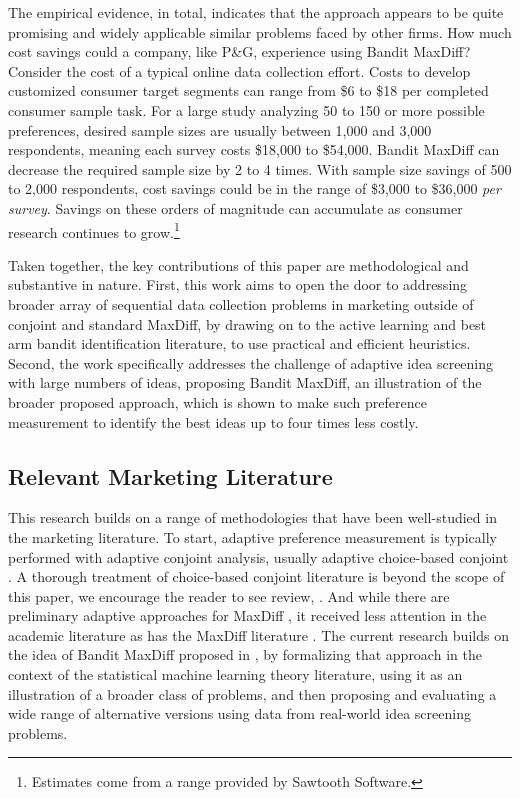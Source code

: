 \documentclass[blindrev,mnsc]{informs3}
\begin{document}
The empirical evidence, in total, indicates that the approach appears to be quite promising and widely applicable similar problems faced by other firms. How much cost savings could a company, like P\&G, experience using Bandit MaxDiff? Consider the cost of a typical online data collection effort. Costs to develop customized consumer target segments can range from \$6 to \$18 per completed consumer sample task. For a large study analyzing 50 to 150 or more possible preferences, desired sample sizes are usually between 1,000 and 3,000 respondents, meaning each survey costs \$18,000 to \$54,000. Bandit MaxDiff can decrease the required sample size by 2 to 4 times. With sample size savings of 500 to 2,000 respondents, cost savings could be in the range of \$3,000 to \$36,000 \emph{per survey}. Savings on these orders of magnitude can accumulate as consumer research continues to grow.\footnote{Estimates come from a range provided by Sawtooth Software.}

Taken together, the key contributions of this paper are methodological and substantive in nature. First, this work aims to open the door to addressing broader array of sequential data collection problems in marketing outside of conjoint and standard MaxDiff, by drawing on to the active learning and best arm bandit identification literature, to use practical and efficient heuristics. Second, the work specifically addresses the challenge of adaptive idea screening with large numbers of ideas, proposing Bandit MaxDiff, an illustration of the broader proposed approach, which is shown to make such preference measurement to identify the best ideas up to four times less costly.


\subsection{Relevant Marketing Literature}

This research builds on a range of methodologies that have been well-studied in the marketing literature. To start, adaptive preference measurement is typically performed with adaptive conjoint analysis, usually adaptive choice-based conjoint \citep{arora2001improving,toubia2003fast,toubia2004polyhedral}. A thorough treatment of choice-based conjoint literature is beyond the scope of this paper, we encourage the reader to see review, \cite{toubia2007chapter}. And while there are preliminary adaptive approaches for MaxDiff \citep{orme2006adaptive}, it received less attention in the academic literature as has the MaxDiff literature \citep{cohen2003maximum}. The current research builds on the idea of Bandit MaxDiff proposed in \cite{fairchildetal2015banditmaxdiff}, by formalizing that approach in the context of the statistical machine learning theory literature, using it as an illustration of a broader class of problems, and then proposing and evaluating a wide range of alternative versions using data from real-world idea screening problems.
\end{document}
